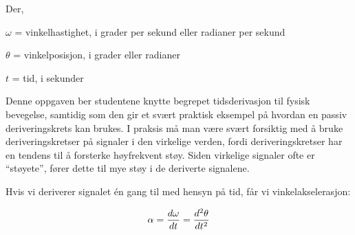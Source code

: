 \noindent
Der,

$\omega$ = vinkelhastighet, i grader per sekund eller radianer per sekund

$\theta$ = vinkelposisjon, i grader eller radianer

$t$ = tid, i sekunder







Denne oppgaven ber studentene knytte begrepet tidsderivasjon til fysisk bevegelse, samtidig som den gir et svært praktisk eksempel på hvordan en passiv deriveringskrets kan brukes. I praksis må man være svært forsiktig med å bruke deriveringskretser på signaler i den virkelige verden, fordi deriveringskretser har en tendens til å forsterke høyfrekvent støy. Siden virkelige signaler ofte er ``støyete'', fører dette til mye støy i de deriverte signalene.

\vskip 10pt

Hvis vi deriverer signalet én gang til med hensyn på tid, får vi vinkelakselerasjon:

$$\alpha = {d\omega \over dt} = {d^2 \theta \over dt^2}$$



